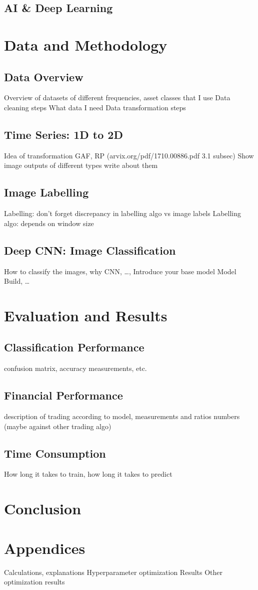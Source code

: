 \documentclass[11pt, a4paper]{article}
\begin{document}
\subsection{AI \& Deep Learning}


\section{Data and Methodology}
\subsection{Data Overview}
Overview of datasets of different frequencies, asset classes that I use
Data cleaning steps
What data I need
Data transformation steps 

\subsection{Time Series: 1D to 2D}
Idea of transformation
GAF, RP (arvix.org/pdf/1710.00886.pdf 3.1 subsec)
Show image outputs of different types
write about them 

\subsection{Image Labelling}
Labelling: don't forget discrepancy in labelling algo vs image labels
Labelling algo: depends on window size

\subsection{Deep CNN: Image Classification}
How to classify the images, why CNN, \dots, 
Introduce your base model
Model Build, \dots

\section{Evaluation and Results}
\subsection{Classification Performance}
confusion matrix, accuracy measurements, etc.

\subsection{Financial Performance}
description of trading according to model, measurements and ratios
numbers (maybe against other trading algo)

\subsection{Time Consumption}
How long it takes to train, how long it takes to predict

\section{Conclusion}

\section{Appendices}
Calculations, explanations
Hyperparameter optimization Results
Other optimization results



\end{document}
